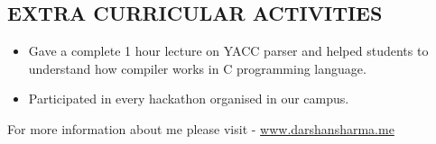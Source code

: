 \documentclass[line, margin, 12pt]{res}
\begin{document}
\begin{resume}
\section{EXTRA CURRICULAR ACTIVITIES}
\begin{itemize}
\item Gave a complete 1 hour lecture on YACC parser and helped students to understand how
compiler works in C programming language.
\item Participated in every hackathon organised in our campus.\\
\end{itemize}

For more information about me please visit - \href{https://www.darshansharma.me}{www.darshansharma.me}
\end{resume}
\end{document}
